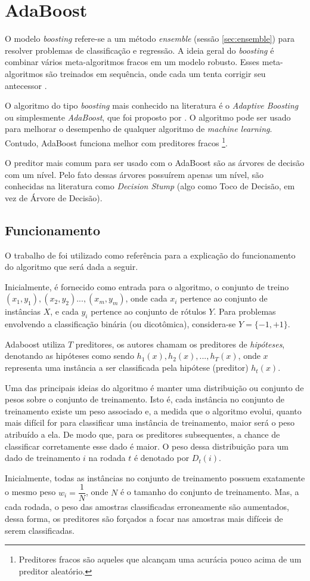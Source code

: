 \section{AdaBoost}

O modelo \textit{boosting} refere-se a um método \textit{ensemble} (sessão \ref{sec:ensemble}) para resolver problemas de classificação e regressão. A ideia geral do \textit{boosting} é  combinar vários meta-algoritmos fracos em um modelo robusto. Esses meta-algoritmos são treinados em sequência, onde cada um tenta corrigir seu antecessor \cite{Kearns:1988}.

O algoritmo do tipo \textit{boosting} mais conhecido na literatura é o \textit{Adaptive Boosting} ou simplesmente \textit{AdaBoost}, que foi proposto por \cite{Freund:1997}. O algoritmo pode ser usado para melhorar o desempenho de qualquer algoritmo de \textit{machine learning}. Contudo, AdaBoost funciona melhor com preditores fracos \footnote{Preditores fracos são aqueles que alcançam uma acurácia pouco acima de um preditor aleatório.}.

O preditor mais comum para ser usado com o AdaBoost são as árvores de decisão com um nível. Pelo fato dessas árvores possuírem apenas um nível, são conhecidas na literatura como \textit{Decision Stump} (algo como Toco de Decisão, em vez de Árvore de Decisão).

\subsection{Funcionamento}
O trabalho de \cite{Freund:1999} foi utilizado como referência para a explicação do funcionamento do algoritmo que será dada a seguir.

Inicialmente, é fornecido como entrada para o algoritmo, o conjunto de treino $(x_1, y_1), (x_2, y_2) ..., (x_m, y_m)$, onde cada $x_i$ pertence ao conjunto de instâncias $X$, e cada $y_i$ pertence ao conjunto de rótulos $Y$. Para problemas envolvendo a classificação binária (ou dicotômica), considera-se $Y = \{-1, +1\}$. 

Adaboost utiliza $T$ preditores, os autores chamam os preditores de \textit{hipóteses}, denotando as hipóteses como sendo $h_1(x), h_2(x),..., h_T(x)$, onde $x$ representa uma instância a ser classificada pela hipótese (preditor) $h_t(x)$.

Uma das principais ideias do algoritmo é manter uma distribuição ou conjunto de
pesos sobre o conjunto de treinamento. Isto é, cada instância no conjunto de treinamento existe um peso associado e, a medida que o algoritmo evolui, quanto mais difícil for para classificar uma instância de treinamento, maior será o peso atribuído a ela. De modo que, para os preditores subsequentes, a chance de classificar corretamente esse dado é maior. O peso dessa distribuição para um dado de treinamento $i$ na rodada $t$ é denotado por $D_t(i)$.

Inicialmente, todas as instâncias no conjunto de treinamento possuem exatamente o mesmo peso $w_i = \dfrac{1}{N}$, onde $N$ é o tamanho do conjunto de treinamento. Mas, a cada rodada, o peso das amostras classificadas erroneamente são aumentados, dessa forma, os preditores são forçados a focar nas amostras mais difíceis de serem classificadas.


